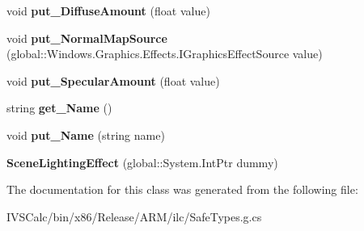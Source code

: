 \begin{DoxyCompactItemize}
\mbox{\label{class_windows_1_1_u_i_1_1_composition_1_1_effects_1_1_scene_lighting_effect_ab97fd435baf0ab6971e0790517c9eed7}} 
void {\bfseries put\+\_\+\+Diffuse\+Amount} (float value)
\item 
\mbox{\label{class_windows_1_1_u_i_1_1_composition_1_1_effects_1_1_scene_lighting_effect_a3d904d5210a2045136bf73c8db87a24c}} 
void {\bfseries put\+\_\+\+Normal\+Map\+Source} (global\+::\+Windows.\+Graphics.\+Effects.\+I\+Graphics\+Effect\+Source value)
\item 
\mbox{\label{class_windows_1_1_u_i_1_1_composition_1_1_effects_1_1_scene_lighting_effect_ac2b4f901ee225dbf3cdfb9cc30dce29f}} 
void {\bfseries put\+\_\+\+Specular\+Amount} (float value)
\item 
\mbox{\label{class_windows_1_1_u_i_1_1_composition_1_1_effects_1_1_scene_lighting_effect_a329a3c4632b041e98216fabb649b253d}} 
string {\bfseries get\+\_\+\+Name} ()
\item 
\mbox{\label{class_windows_1_1_u_i_1_1_composition_1_1_effects_1_1_scene_lighting_effect_ad3892d54c331a9399f4cf56411eb90e4}} 
void {\bfseries put\+\_\+\+Name} (string name)
\item 
\mbox{\label{class_windows_1_1_u_i_1_1_composition_1_1_effects_1_1_scene_lighting_effect_afff80213a8904d6dd8b195b883e7a6b1}} 
{\bfseries Scene\+Lighting\+Effect} (global\+::\+System.\+Int\+Ptr dummy)
\end{DoxyCompactItemize}


The documentation for this class was generated from the following file\+:\begin{DoxyCompactItemize}
\item 
I\+V\+S\+Calc/bin/x86/\+Release/\+A\+R\+M/ilc/Safe\+Types.\+g.\+cs\end{DoxyCompactItemize}
